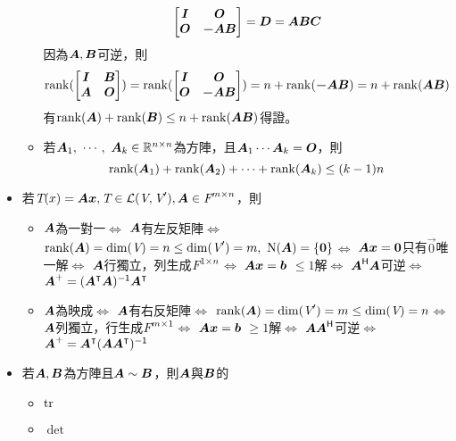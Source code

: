 \begin{itemize}
\begin{itemize}
\begin{equation}
\begin{bmatrix}
				\boldsymbol{I} & \boldsymbol{O} \\
				\boldsymbol{O} & \boldsymbol{-AB}
			\end{bmatrix} = \boldsymbol{D} = \boldsymbol{A}\boldsymbol{B}\boldsymbol{C}
		\end{equation} 因為$\boldsymbol{A}, \boldsymbol{B}$可逆，則\begin{equation}
			\operatorname{rank}(\begin{bmatrix}
				\boldsymbol{I} & \boldsymbol{B} \\
				\boldsymbol{A} & \boldsymbol{O}
			\end{bmatrix}) = 
			\operatorname{rank}(\begin{bmatrix}
				\boldsymbol{I} & \boldsymbol{O} \\
				\boldsymbol{O} & \boldsymbol{-AB}
			\end{bmatrix}) = n + \operatorname{rank}(\boldsymbol{-AB}) = n + \operatorname{rank}(\boldsymbol{AB})
		\end{equation} 有$\operatorname{rank}(\boldsymbol{A}) + \operatorname{rank}(\boldsymbol{B}) \le n + \operatorname{rank}(\boldsymbol{AB})$得證。
		\item 若$\boldsymbol{A}_1, \ \cdots, \ \boldsymbol{A}_k \in \mathbb{R}^{n \times n}$為方陣，且$\boldsymbol{A}_1\cdots\boldsymbol{A}_k = \boldsymbol{O}$，則\begin{equation}
			\operatorname{rank}(\boldsymbol{A}_1) + \operatorname{rank}(\boldsymbol{A}_2) + \cdots + \operatorname{rank}(\boldsymbol{A}_k) \le (k - 1)n 
		\end{equation} 
    \end{itemize}
    \item 若$\textit{T}(x) = \boldsymbol{A}\boldsymbol{x}, \textit{T} \in \mathcal{L}(\textit{V}, \textit{V}'), \boldsymbol{A} \in \textit{F}^{m \times n}$，則
	\begin{itemize}
		\item $\boldsymbol{A}$為一對一$\iff$
		$\boldsymbol{A}$有左反矩陣$\iff$
		$\operatorname{rank}(\boldsymbol{A}) = \dim(\textit{V}) = n \le \dim(\textit{V}') = m, \ \operatorname{N}(\boldsymbol{A}) = \{\boldsymbol{0}\}$$\iff$
		$\boldsymbol{A}\boldsymbol{x} = \boldsymbol{0}$只有$\vec{0}$唯一解$\iff$
		$\boldsymbol{A}$行獨立，列生成$\textit{F}^{1 \times n}$$\iff$
		$\boldsymbol{A}\boldsymbol{x} = \boldsymbol{b}$ $\le 1$解$\iff$
		$\boldsymbol{A}^{\mathsf{H}} \boldsymbol{A}$可逆$\iff$
		$\boldsymbol{A}^+ = (\boldsymbol{A}^\intercal\boldsymbol{A})^{\mathsf{-1}}\boldsymbol{A}^\intercal$
		\item $\boldsymbol{A}$為映成$\iff$
		$\boldsymbol{A}$有右反矩陣$\iff$
		$\operatorname{rank}(\boldsymbol{A}) = \dim(\textit{V}') = m \le \dim(\textit{V}) = n$$\iff$
		$\boldsymbol{A}$列獨立，行生成$\textit{F}^{m \times 1}$$\iff$
		$\boldsymbol{A}\boldsymbol{x} = \boldsymbol{b}$ $\ge 1$解$\iff$
		$\boldsymbol{A}\boldsymbol{A}^{\mathsf{H}}$可逆$\iff$
		$\boldsymbol{A}^+ = \boldsymbol{A}^\intercal(\boldsymbol{A}\boldsymbol{A}^\intercal)^{\mathsf{-1}}$
    \end{itemize}
    \item 若$\boldsymbol{A}, \boldsymbol{B}$為方陣且$\boldsymbol{A} \sim \boldsymbol{B}$，則$\boldsymbol{A}$與$\boldsymbol{B}$的
	\begin{itemize}
		\item $\operatorname{tr}$
		\item $\det$

\end{itemize}
\end{itemize}
